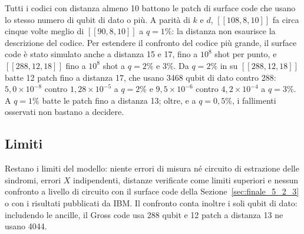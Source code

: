 \begin{onehalfspace}
\begin{table}[H]
\end{table}

Tutti i codici con distanza almeno 10 battono le patch di surface code
che usano lo stesso numero di qubit di dato o più. A parità di $k$ e $d$,
$[[108,8,10]]$ fa circa cinque volte meglio di $[[90,8,10]]$ a
$q = 1\%$: la distanza non esaurisce la descrizione del codice. Per
estendere il confronto del codice più grande, il surface code è stato
simulato anche a distanza 15 e 17, fino a $10^8$ shot per punto, e
$[[288,12,18]]$ fino a $10^8$ shot a $q = 2\%$ e $3\%$. Da $q = 2\%$ in su
$[[288,12,18]]$ batte 12 patch fino a distanza 17, che usano 3468 qubit
di dato contro 288: $5{,}0\times10^{-8}$ contro $1{,}28\times10^{-5}$ a
$q = 2\%$ e $9{,}5\times10^{-6}$ contro $4{,}2\times10^{-4}$ a $q = 3\%$.
A $q = 1\%$ batte le patch fino a distanza 13; oltre, e a $q = 0{,}5\%$,
i fallimenti osservati non bastano a decidere.

\subsection{Limiti}
\label{app:gross_limiti}

Restano i limiti del modello: niente errori di misura né circuito di
estrazione delle sindromi, errori $X$ indipendenti, distanze verificate
come limiti superiori e nessun confronto a livello di circuito con il
surface code della Sezione~\ref{sec:finale_5_2_3} o con i risultati
pubblicati da IBM. Il confronto conta inoltre i soli qubit di dato:
includendo le ancille, il Gross code usa 288 qubit e 12 patch a distanza
13 ne usano 4044.

\end{onehalfspace}


